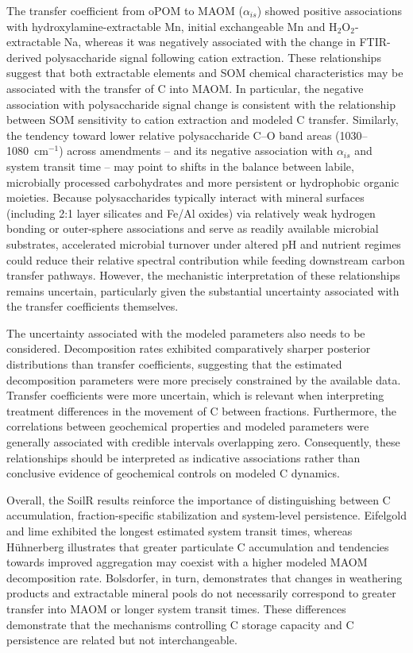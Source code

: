 \documentclass[preprint,12pt]{elsarticle}
\begin{document}
The transfer coefficient from oPOM to MAOM ($\alpha_{is}$) showed positive associations with hydroxylamine-extractable Mn, initial exchangeable Mn and H$_2$O$_2$-extractable Na, whereas it was negatively associated with the change in FTIR-derived polysaccharide signal following cation extraction. These relationships suggest that both extractable elements and SOM chemical characteristics may be associated with the transfer of C into MAOM. In particular, the negative association with polysaccharide signal change is consistent with the relationship between SOM sensitivity to cation extraction and modeled C transfer. Similarly, the tendency toward lower relative polysaccharide C--O band areas (1030--1080~cm$^{-1}$) across amendments – and its negative association with $\alpha_{is}$ and system transit time – may point to shifts in the balance between labile, microbially processed carbohydrates and more persistent or hydrophobic organic moieties. Because polysaccharides typically interact with mineral surfaces (including 2:1 layer silicates and Fe/Al oxides) via relatively weak hydrogen bonding or outer-sphere associations and serve as readily available microbial substrates, accelerated microbial turnover under altered pH and nutrient regimes could reduce their relative spectral contribution while feeding downstream carbon transfer pathways. However, the mechanistic interpretation of these relationships remains uncertain, particularly given the substantial uncertainty associated with the transfer coefficients themselves.

The uncertainty associated with the modeled parameters also needs to be considered. Decomposition rates exhibited comparatively sharper posterior distributions than transfer coefficients, suggesting that the estimated decomposition parameters were more precisely constrained by the available data. Transfer coefficients were more uncertain, which is relevant when interpreting treatment differences in the movement of C between fractions. Furthermore, the correlations between geochemical properties and modeled parameters were generally associated with credible intervals overlapping zero. Consequently, these relationships should be interpreted as indicative associations rather than conclusive evidence of geochemical controls on modeled C dynamics.

Overall, the SoilR results reinforce the importance of distinguishing between C accumulation, fraction-specific stabilization and system-level persistence. Eifelgold and lime exhibited the longest estimated system transit times, whereas Hühnerberg illustrates that greater particulate C accumulation and tendencies towards improved aggregation may coexist with a higher modeled MAOM decomposition rate. Bolsdorfer, in turn, demonstrates that changes in weathering products and extractable mineral pools do not necessarily correspond to greater transfer into MAOM or longer system transit times. These differences demonstrate that the mechanisms controlling C storage capacity and C persistence are related but not interchangeable.
\end{document}

